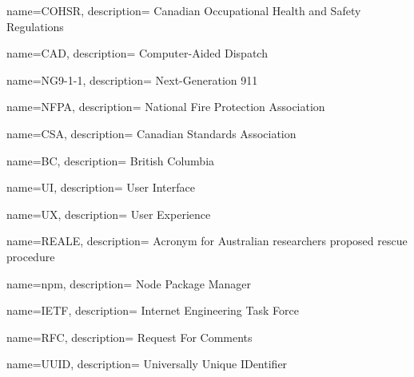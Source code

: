 {
  name={COHSR},
  description={
    Canadian Occupational Health and Safety Regulations
  }
}

{
  name={CAD},
  description={
    Computer-Aided Dispatch
  }
}

{
  name={NG9-1-1},
  description={
    Next-Generation 911
  }
}

{
  name={NFPA},
  description={
    National Fire Protection Association
  }
}

{
  name={CSA},
  description={
    Canadian Standards Association
  }
}

{
  name={BC},
  description={
    British Columbia
  }
}

{
  name={UI},
  description={
    User Interface
  }
}

{
  name={UX},
  description={
    User Experience
  }
}

{
  name={REALE},
  description={
    Acronym for Australian researchers proposed rescue procedure
  }
}

{
  name={npm},
  description={
    Node Package Manager
  }
}

{
  name={IETF},
  description={
    Internet Engineering Task Force
  }
}

{
  name={RFC},
  description={
    Request For Comments
  }
}

{
  name={UUID},
  description={
    Universally Unique IDentifier
  }
}
